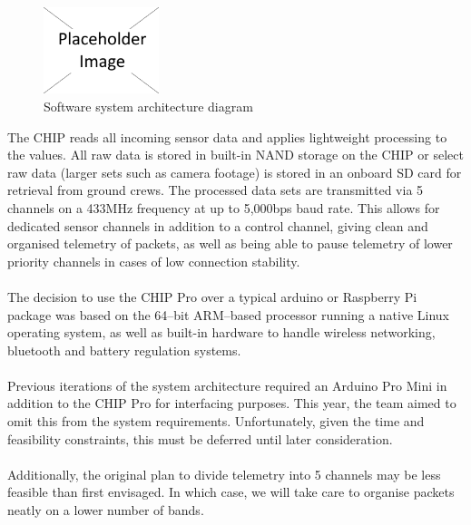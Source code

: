 \documentclass{report}
\begin{document}
		\begin{figure}
			\vspace{-30pt}
	 		\begin{center}
			\includegraphics[width=0.30\textwidth]{placeholder}
			\end{center}
			\vspace{-15pt}
			\caption[X]{Software system architecture diagram}
		\end{figure}

		The CHIP reads all incoming sensor data and applies lightweight processing
		to the values. All raw data is stored in built-in NAND storage on the CHIP
		or select raw data (larger sets such as camera footage) is stored in an
		onboard SD card for retrieval from ground crews. The processed data sets 
		are transmitted via 5 channels on a 433MHz frequency at up to 5,000bps
		baud rate. This allows for dedicated sensor channels in addition to a control
		channel, giving clean and organised telemetry of packets, as well as being
		able to pause telemetry of lower priority channels in cases of low 
		connection stability.
		\\\\
		The decision to use the CHIP Pro over a typical arduino or Raspberry Pi
		package was based on the 64--bit ARM--based processor running a 
		native Linux operating system, as well as built-in hardware to handle 
		wireless networking, bluetooth and battery regulation systems.
		\\\\
		{\color{blue}Previous iterations of the system architecture required 
		an Arduino Pro Mini in addition to the CHIP Pro for interfacing purposes.
		This year, the team aimed to omit this from the system requirements.
		Unfortunately, given the time and feasibility constraints, this must be deferred
		until later consideration.
		\\\\
		Additionally, the original plan to divide telemetry into
		5 channels may be less feasible than first envisaged. In which case, we will 
		take care to organise packets neatly on a lower number of bands.
		}
\end{document}
